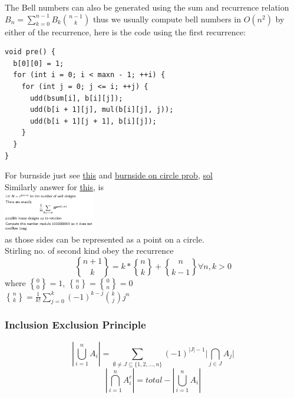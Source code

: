 \documentclass[8pt, a4paper, oneside, twocolumn]{extarticle}
\DeclareRobustCommand{\stirling}{\genfrac\{\}{0pt}{}}
\begin{document}
The Bell numbers can also be generated using the sum and recurrence relation
$B_n=\sum_{k=0}^{n-1}B_k \binom{n - 1}{k}$ thus we usually compute bell numbers in $O(n^2)$ by either of the recurrence, here is the code using the first recurrence:
\begin{verbatim}
void pre() {
  b[0][0] = 1;
  for (int i = 0; i < maxn - 1; ++i) {
    for (int j = 0; j <= i; ++j) {
      udd(bsum[i], b[i][j]);
      udd(b[i + 1][j], mul(b[i][j], j));
      udd(b[i + 1][j + 1], b[i][j]);
    }
  }
}
\end{verbatim}
For burnside just see \href{https://codeforces.com/blog/entry/62401}{this} and \href{http://poj.org/problem?id=1286}{burnside on circle prob}, \href{https://github.com/sourabh2311/Competitive-Programming/blob/master/IMP%20QUES/BURNSIDE/2.CPP}{sol}
\\Similarly answer for \href{http://gcpc.nwerc.eu/problemset_2017.pdf}{this}, is \\\includegraphics[width=0.3\textwidth,height=0.3\textheight,keepaspectratio]{brnsq}
\\as those sides can be represented as a point on a circle.
\\Stirling no. of second kind obey the recurrence $$\stirling{n + 1}{k} = k * \stirling{n}{k} + \stirling{n}{k - 1} \forall n, k > 0$$ where $\stirling{0}{0} = 1$, $\stirling{n}{0} = \stirling{0}{n} = 0$
\\$\stirling{n}{k} = \frac{1}{k!}\sum_{j=0}^{k}(-1)^{k-j}\binom{k}{j}j^n$
\subsubsection{Inclusion Exclusion Principle}
$$\left|\bigcup_{i=1}^n A_i \right| = \sum_{\emptyset \neq J\subseteq \{1,2,\ldots ,n\}} (-1)^{|J|-1}{\Biggl |}\bigcap_{j\in J}A_{j}{\Biggr |}$$
$$|\bigcap_{i = 1}^n A_{i}^c| = total - |\bigcup_{i = 1}^n A_i|$$
\end{document}
